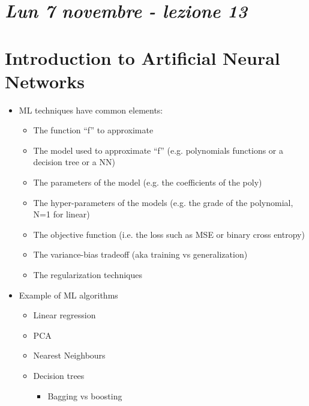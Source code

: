 


\section{\textit{Lun 7 novembre - lezione 13}}

\section{Introduction to Artificial Neural Networks}

\begin{tcolorbox}[width=\textwidth,colback={white},title={Recap lezione 1 },colbacktitle=cyan,coltitle=black]
	\begin{itemize}
	\item ML techniques have common elements:
		\begin{itemize}
			\item The function “f” to approximate
			\item The model used to approximate “f” (e.g. polynomials functions or a decision tree or a NN)
			\item The parameters of the model (e.g. the coefficients of the poly) 
			\item The hyper-parameters of the models (e.g. the grade of the polynomial, N=1 for linear)
			\item The objective function (i.e. the loss such as MSE or binary cross entropy)
			\item The variance-bias tradeoff (aka training vs generalization)
			\item The regularization techniques
		\end{itemize}
	\item Example of ML algorithms
		\begin{itemize}
			\item Linear regression
			\item PCA
			\item Nearest Neighbours
			\item Decision trees
			\begin{itemize}
				\item Bagging vs boosting
			\end{itemize}
		\end{itemize}
	\end{itemize} 
\end{tcolorbox}

